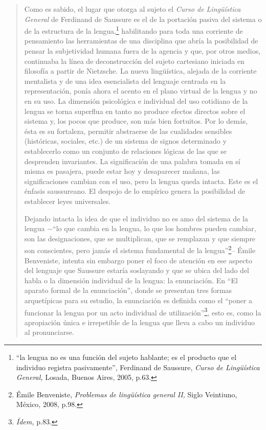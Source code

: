 \begin{quote}
Como es sabido, el lugar que otorga al sujeto el \emph{Curso de Lingüística General} de Ferdinand de Saussure es el de la portación pasiva del sistema o de la estructura de la lengua,\footnote{\enquote{la lengua no es una función del sujeto hablante; es el producto que el individuo registra pasivamente}, Ferdinand de Saussure, \emph{Curso de Lingüística General,} Losada, Buenos Aires, 2005, p.63.} habilitando para toda una corriente de pensamiento las herramientas de una disciplina que abría la posibilidad de pensar la subjetividad humana fuera de la agencia y que, por otros medios, continuaba la línea de deconstrucción del sujeto cartesiano iniciada en filosofía a partir de Nietzsche. La nueva lingüística, alejada de la corriente mentalista y de una idea esencialista del lenguaje centrada en la representación, ponía ahora el acento en el plano virtual de la lengua y no en su uso. La dimensión psicológica e individual del uso cotidiano de la lengua se torna superflua en tanto no produce efectos directos sobre el sistema y, los pocos que produce, son más bien fortuitos. Por lo demás, ésta es su fortaleza, permitir abstraerse de las cualidades sensibles (históricas, sociales, etc.) de un sistema de signos determinado y establecerlo como un conjunto de relaciones lógicas de las que se desprenden invariantes. La significación de una palabra tomada en sí misma es pasajera, puede estar hoy y desaparecer mañana, las significaciones cambian con el uso, pero la lengua queda intacta. Este es el énfasis saussureano. El despojo de lo empírico genera la posibilidad de establecer leyes universales.

Dejando intacta la idea de que el individuo no es amo del sistema de la lengua −\enquote{lo que cambia en la lengua, lo que los hombres pueden cambiar, son las designaciones, que se multiplican, que se remplazan y que siempre son conscientes, pero jamás el sistema fundamental de la lengua}\footnote{Émile Benveniste, \emph{Problemas de lingüística general II,} Siglo Veintiuno, México, 2008, p.98.}-- Émile Benveniste, intenta sin embargo poner el foco de atención en ese aspecto del lenguaje que Saussure estaría soslayando y que se ubica del lado del habla o la dimensión individual de la lengua: la enunciación. En \enquote{El aparato formal de la enunciación}, donde se presentan tres formas arquetípicas para su estudio, la enunciación es definida como el \enquote{poner a funcionar la lengua por un acto individual de utilización}\footnote{\emph{Ídem,} p.83.}, esto es, como la apropiación única e irrepetible de la lengua que lleva a cabo un individuo al pronunciarse.


\end{quote}
